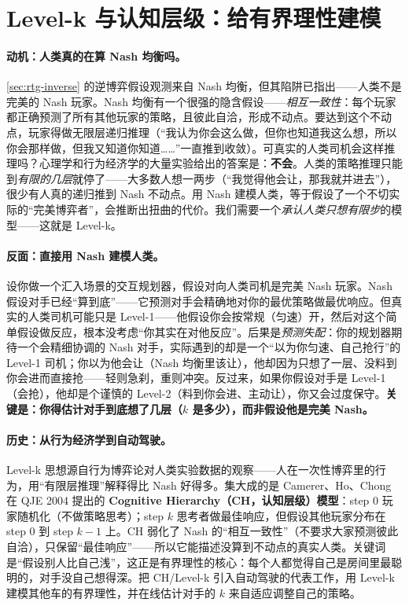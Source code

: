 \section{Level-k 与认知层级：给有界理性建模}
\label{sec:rtg-levelk}

\paragraph{动机：人类真的在算 Nash 均衡吗。}
\cref{sec:rtg-inverse} 的逆博弈假设观测来自 Nash 均衡，但其陷阱已指出——人类不是完美的 Nash 玩家。Nash 均衡有一个很强的隐含假设——\emph{相互一致性}：每个玩家都正确预测了所有其他玩家的策略，且彼此自洽，形成不动点。要达到这个不动点，玩家得做无限层递归推理（“我认为你会这么做，但你也知道我这么想，所以你会那样做，但我又知道你知道……”一直推到收敛）。可真实的人类司机会这样推理吗？心理学和行为经济学的大量实验给出的答案是：\textbf{不会}。人类的策略推理只能到\emph{有限的几层}就停了——大多数人想一两步（“我觉得他会让，那我就并进去”），很少有人真的递归推到 Nash 不动点。用 Nash 建模人类，等于假设了一个不切实际的“完美博弈者”，会推断出扭曲的代价。我们需要一个\emph{承认人类只想有限步}的模型——这就是 Level-k。

\paragraph{反面：直接用 Nash 建模人类。}
设你做一个汇入场景的交互规划器，假设对向人类司机是完美 Nash 玩家。Nash 假设对手已经“算到底”——它预测对手会精确地对你的最优策略做最优响应。但真实的人类司机可能只是 Level-1——他假设你会按常规（匀速）开，然后对这个简单假设做反应，根本没考虑“你其实在对他反应”。后果是\emph{预测失配}：你的规划器期待一个会精细协调的 Nash 对手，实际遇到的却是一个“以为你匀速、自己抢行”的 Level-1 司机；你以为他会让（Nash 均衡里该让），他却因为只想了一层、没料到你会进而直接抢——轻则急刹，重则冲突。反过来，如果你假设对手是 Level-1（会抢），他却是个谨慎的 Level-2（料到你会进、主动让），你又会过度保守。\textbf{关键是：你得估计对手到底想了几层（$k$ 是多少），而非假设他是完美 Nash。}

\paragraph{历史：从行为经济学到自动驾驶。}
Level-k 思想源自行为博弈论对人类实验数据的观察——人在一次性博弈里的行为，用“有限层推理”解释得比 Nash 好得多。集大成的是 Camerer、Ho、Chong 在 QJE 2004 提出的 \textbf{Cognitive Hierarchy（CH，认知层级）模型}\cite{camerer2004cognitive}：step 0 玩家随机化（不做策略思考）；step $k$ 思考者做最佳响应，但假设其他玩家分布在 step 0 到 step $k-1$ 上。CH 弱化了 Nash 的“相互一致性”（不要求大家预测彼此自洽），只保留“最佳响应”——所以它能描述没算到不动点的真实人类。关键词是“假设别人比自己浅”，这正是有界理性的核心：每个人都觉得自己是房间里最聪明的，对手没自己想得深。把 CH/Level-k 引入自动驾驶的代表工作，用 Level-k 建模其他车的有界理性，并在线估计对手的 $k$ 来自适应调整自己的策略\cite{li2018game}。

